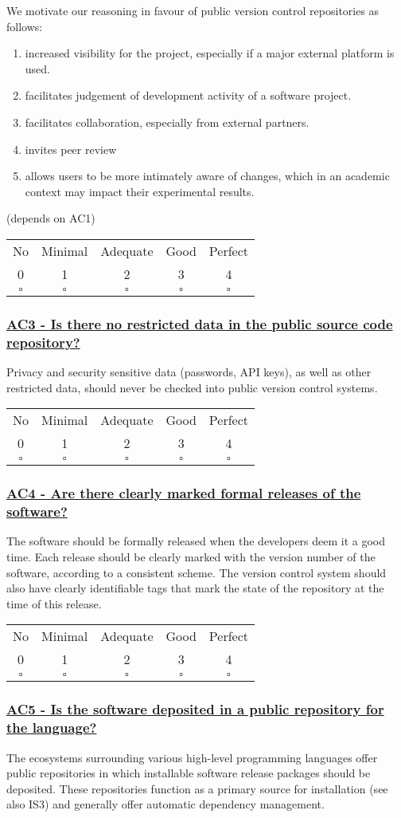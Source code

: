 \documentclass[a4paper,11pt]{article}
\newcommand{\criterion}[2]{\subsubsection*{\underline{#1 - #2}}\label{id:#1}}
\newcommand\CheckTable{%
  \begin{tabular}{ccccc}
    No & Minimal & Adequate & Good & Perfect \\
    0 & 1 & 2 & 3 & 4 \\
    \hline
    $\square$ & $\square$ & $\square$ & $\square$ & $\square$ \\
  \end{tabular}%
}
\begin{document}
We motivate our reasoning in favour of public version control repositories as follows:

\begin{enumerate}
    \item increased visibility for the project, especially if a major external platform is used.
    \item facilitates judgement of development activity of a software project.
    \item facilitates collaboration, especially from external partners.
    \item invites peer review
    \item allows users to be more intimately aware of changes, which in an
        academic context may impact their experimental results.
\end{enumerate}

(depends on AC1)

\CheckTable

\newcommand{\acThreeID}{AC3}
\newcommand{\acThreeText}{Is there no restricted data in the public source code repository?}
\criterion{\acThreeID}{\acThreeText}

Privacy and security sensitive data (passwords, API keys), as well as other
restricted data, should never be checked into public version control systems.

\CheckTable

\newcommand{\acFourID}{AC4}
\newcommand{\acFourText}{Are there clearly marked formal releases of the software?}
\criterion{\acFourID}{\acFourText}

The software should be formally released when the developers deem it a good
time. Each release should be clearly marked with the version number of the
software, according to a consistent scheme. The version control system should
also have clearly identifiable tags that mark the state of the repository at
the time of this release.

\CheckTable

\newcommand{\acFiveID}{AC5}
\newcommand{\acFiveText}{Is the software deposited in a public repository for the language?}
\criterion{\acFiveID}{\acFiveText}

The ecosystems surrounding various high-level programming languages offer
public repositories in which installable software release packages should be
deposited. These repositories function as a primary source for installation (see also
IS3) and generally offer automatic dependency management.
\end{document}

